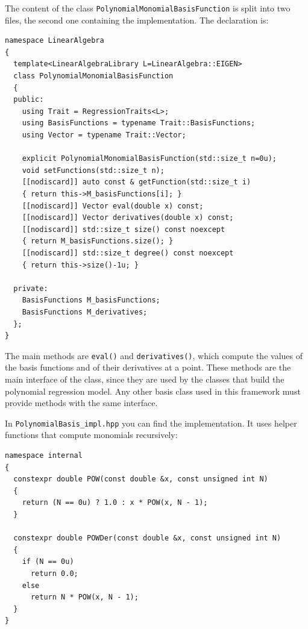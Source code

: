 \documentclass{article}
\newcommand{\li}{\lstinline}
\begin{document}
The content of the class \li!PolynomialMonomialBasisFunction! is split into two files, the second one containing the implementation. The declaration is:
\begin{lstlisting}[title={PolynomialBasis.hpp}]
namespace LinearAlgebra
{
  template<LinearAlgebraLibrary L=LinearAlgebra::EIGEN>
  class PolynomialMonomialBasisFunction
  {
  public:
    using Trait = RegressionTraits<L>;
    using BasisFunctions = typename Trait::BasisFunctions;
    using Vector = typename Trait::Vector;

    explicit PolynomialMonomialBasisFunction(std::size_t n=0u);
    void setFunctions(std::size_t n);
    [[nodiscard]] auto const & getFunction(std::size_t i)
    { return this->M_basisFunctions[i]; }
    [[nodiscard]] Vector eval(double x) const;
    [[nodiscard]] Vector derivatives(double x) const;
    [[nodiscard]] std::size_t size() const noexcept
    { return M_basisFunctions.size(); }
    [[nodiscard]] std::size_t degree() const noexcept
    { return this->size()-1u; }

  private:
    BasisFunctions M_basisFunctions;
    BasisFunctions M_derivatives;
  };
}
\end{lstlisting}

The main methods are \li!eval()! and \li!derivatives()!, which compute the values of the basis functions and of their derivatives at a point. These methods are the main interface of the class, since they are used by the classes that build the polynomial regression model. Any other basis class used in this framework must provide methods with the same interface.

In \texttt{PolynomialBasis\_impl.hpp} you can find the implementation. It uses helper functions that compute monomials recursively:
\begin{lstlisting}[title={The functions for computing a monomial and its derivative}]
namespace internal
{
  constexpr double POW(const double &x, const unsigned int N)
  {
    return (N == 0u) ? 1.0 : x * POW(x, N - 1);
  }

  constexpr double POWDer(const double &x, const unsigned int N)
  {
    if (N == 0u)
      return 0.0;
    else
      return N * POW(x, N - 1);
  }
}
\end{lstlisting}
\end{document}

